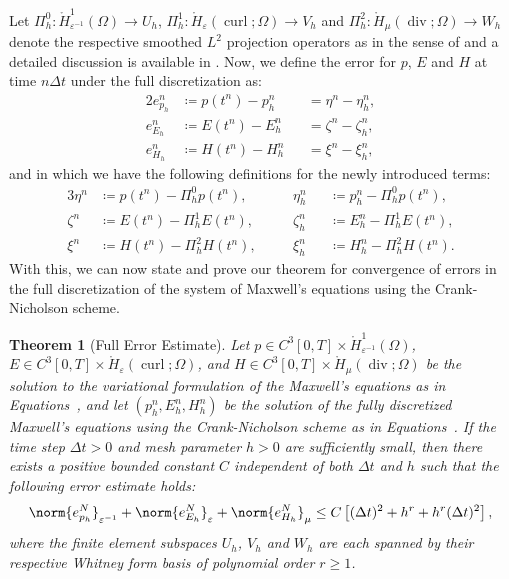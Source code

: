 \documentclass{amsart}
\theoremstyle{thmstyleone}%
\newtheorem{theorem}{Theorem}%
\theoremstyle{thmstyletwo}%
\theoremstyle{thmstylethree}%
\newcommand{\longto}{\longrightarrow}
\DeclareMathOperator{\curl}{curl}
\def\divgn{\operatorname{div}}
\begin{document}
Let $\Pi_h^0: \mathring{H}^1_{\varepsilon^{-1}}(\Omega) \longto U_h$, $\Pi_h^1: \mathring{H}_{\varepsilon}(\curl; \Omega) \longto V_h$ and $\Pi_h^2: \mathring{H}_{\mu}(\divgn; \Omega) \longto W_h$ denote the respective smoothed $L^2$ projection operators as in the sense of \cite{Schoberl2008,Christiansen2007} and a detailed discussion is available in \cite{ArFaWi2006}. Now, we define the error for $p$, $E$ and $H$ at time $n \Delta t$ under the full discretization as:
\begin{alignat}{2}
  e_{p_h}^n &\coloneq p(t^n) - p_h^n &&= \eta^n - \eta_h^n, \label{eqn:p_fullerror_cn} \\
  e_{E_h}^n &\coloneq E(t^n) - E_h^n &&= \zeta^n - \zeta_h^n, \label{eqn:E_fullerror_cn} \\
  e_{H_h}^n &\coloneq H(t^n) - H_h^n &&= \xi^n - \xi_h^n, \label{eqn:H_fullerror_cn}
\end{alignat}
and in which we have the following definitions for the newly introduced terms:
\begin{alignat}{3}
  \eta^n &\coloneq p(t^n) - \Pi_h^0 p(t^n), &&\quad \eta_h^n &&\coloneq p_h^n  - \Pi_h^0 p(t^n), \label{eqn:p_fullerror_sub_cn} \\
  \zeta^n &\coloneq E(t^n) - \Pi_h^1 E(t^n), &&\quad \zeta_h^n &&\coloneq E_h^n - \Pi_h^1 E(t^n), \label{eqn:E_fullerror_sub_cn} \\
  \xi^n &\coloneq H(t^n) - \Pi_h^2 H(t^n), &&\quad \xi_h^n &&\coloneq H_h^n - \Pi_h^2 H(t^n). \label{eqn:H_fullerror_sub_cn}
\end{alignat}
With this, we can now state and prove our theorem for convergence of errors in the full discretization of the system of Maxwell's equations using the Crank-Nicholson scheme.

\begin{theorem}[Full Error Estimate] \label{thm:full_error_estimate_cn}
Let $p \in C^3[0, T] \times \mathring{H}^1_{\varepsilon^{-1}}(\Omega)$, $E \in C^3[0, T] \times \mathring{H}_{\varepsilon}(\curl; \Omega)$, and $H \in C^3[0, T] \times \mathring{H}_{\mu}(\divgn; \Omega)$ be the solution to the variational formulation of the Maxwell's equations as in Equations~, and let $(p_h^n, E_h^n, H_h^n)$ be the solution of the fully discretized Maxwell's equations using the Crank-Nicholson scheme as in Equations~. If the time step $\Delta t > 0$ and mesh parameter $h > 0$ are sufficiently small, then there exists a positive bounded constant $C$ independent of both $\Delta t$ and $h$ such that the following error estimate holds:
\[
  \norm{e_{p_h}^N}_{\varepsilon^{-1}} + \norm{e_{E_h}^{N}}_{\varepsilon} + \norm{e_{H_h}^{N}}_{\mu} \le C \left[ (\Delta t)^2 + h^r + h^r (\Delta t)^2 \right],
\]
where the finite element subspaces $U_h$, $V_h$ and $W_h$ are each spanned by their respective Whitney form basis of polynomial order $r \ge 1$.
\end{theorem}
\end{document}
